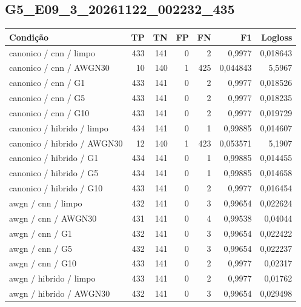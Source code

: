 \subsection{G5\_E09\_3\_20261122\_002232\_435}
\small\begin{longtable}{@{}p{.38\linewidth}rrrrrr@{}}
\toprule Condição & TP & TN & FP & FN & F1 & Logloss\\\midrule\endhead
canonico /\allowbreak{} cnn /\allowbreak{} limpo & 433 & 141 & 0 & 2 & 0,9977 & 0,018643\\
canonico /\allowbreak{} cnn /\allowbreak{} AWGN30 & 10 & 140 & 1 & 425 & 0,044843 & 5,5967\\
canonico /\allowbreak{} cnn /\allowbreak{} G1 & 433 & 141 & 0 & 2 & 0,9977 & 0,018526\\
canonico /\allowbreak{} cnn /\allowbreak{} G5 & 433 & 141 & 0 & 2 & 0,9977 & 0,018235\\
canonico /\allowbreak{} cnn /\allowbreak{} G10 & 433 & 141 & 0 & 2 & 0,9977 & 0,019729\\
canonico /\allowbreak{} hibrido /\allowbreak{} limpo & 434 & 141 & 0 & 1 & 0,99885 & 0,014607\\
canonico /\allowbreak{} hibrido /\allowbreak{} AWGN30 & 12 & 140 & 1 & 423 & 0,053571 & 5,1907\\
canonico /\allowbreak{} hibrido /\allowbreak{} G1 & 434 & 141 & 0 & 1 & 0,99885 & 0,014455\\
canonico /\allowbreak{} hibrido /\allowbreak{} G5 & 434 & 141 & 0 & 1 & 0,99885 & 0,014658\\
canonico /\allowbreak{} hibrido /\allowbreak{} G10 & 433 & 141 & 0 & 2 & 0,9977 & 0,016454\\
awgn /\allowbreak{} cnn /\allowbreak{} limpo & 432 & 141 & 0 & 3 & 0,99654 & 0,022624\\
awgn /\allowbreak{} cnn /\allowbreak{} AWGN30 & 431 & 141 & 0 & 4 & 0,99538 & 0,04044\\
awgn /\allowbreak{} cnn /\allowbreak{} G1 & 432 & 141 & 0 & 3 & 0,99654 & 0,022422\\
awgn /\allowbreak{} cnn /\allowbreak{} G5 & 432 & 141 & 0 & 3 & 0,99654 & 0,022237\\
awgn /\allowbreak{} cnn /\allowbreak{} G10 & 433 & 141 & 0 & 2 & 0,9977 & 0,02317\\
awgn /\allowbreak{} hibrido /\allowbreak{} limpo & 433 & 141 & 0 & 2 & 0,9977 & 0,01762\\
awgn /\allowbreak{} hibrido /\allowbreak{} AWGN30 & 432 & 141 & 0 & 3 & 0,99654 & 0,029498\\

\end{longtable}

